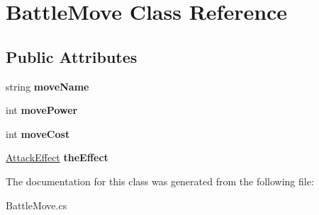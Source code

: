 \hypertarget{class_battle_move}{}\section{Battle\+Move Class Reference}
\label{class_battle_move}
\subsection*{Public Attributes}
\begin{DoxyCompactItemize}
\item 
\mbox{\label{class_battle_move_ac005e48083d6d35e58e1541516557af6}} 
string {\bfseries move\+Name}
\item 
\mbox{\label{class_battle_move_adf53fb901504816aede00d2c8af8b131}} 
int {\bfseries move\+Power}
\item 
\mbox{\label{class_battle_move_a2ed3906d38c867eca3e23590b051320c}} 
int {\bfseries move\+Cost}
\item 
\mbox{\label{class_battle_move_a6fdd6544802f30b28f0f7fa4564cacbc}} 
\mbox{\hyperlink{class_attack_effect}{Attack\+Effect}} {\bfseries the\+Effect}
\end{DoxyCompactItemize}


The documentation for this class was generated from the following file\+:\begin{DoxyCompactItemize}
\item 
Battle\+Move.\+cs\end{DoxyCompactItemize}
